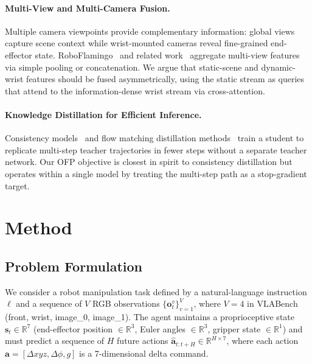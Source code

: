 \documentclass[10pt,twocolumn]{article}
\begin{document}
\paragraph{Multi-View and Multi-Camera Fusion.}
Multiple camera viewpoints provide complementary information: global views
capture scene context while wrist-mounted cameras reveal fine-grained
end-effector state.
RoboFlamingo~\cite{li2023roboflamingo} and related work~\cite{shridhar2023perceiver}
aggregate multi-view features via simple pooling or concatenation.
We argue that static-scene and dynamic-wrist features should be fused
asymmetrically, using the static stream as queries that attend to the
information-dense wrist stream via cross-attention.

\paragraph{Knowledge Distillation for Efficient Inference.}
Consistency models~\cite{song2023consistency} and flow matching distillation
methods~\cite{liu2023flow} train a student to replicate multi-step teacher
trajectories in fewer steps without a separate teacher network.
Our OFP objective is closest in spirit to consistency distillation but
operates within a single model by treating the multi-step path as a
stop-gradient target.


\section{Method}
\label{sec:method}

\subsection{Problem Formulation}
\label{sec:method:problem}

We consider a robot manipulation task defined by a natural-language instruction
$\ell$ and a sequence of $V$ RGB observations
$\{\mathbf{o}^v_t\}_{v=1}^{V}$, where $V{=}4$ in VLABench
(front, wrist, image\_0, image\_1).
The agent maintains a proprioceptive state
$\mathbf{s}_t \in \mathbb{R}^{7}$
(end-effector position $\in\mathbb{R}^3$, Euler angles $\in\mathbb{R}^3$,
gripper state $\in\mathbb{R}^1$)
and must predict a sequence of $H$ future actions
$\hat{\mathbf{a}}_{t:t+H} \in \mathbb{R}^{H \times 7}$,
where each action $\mathbf{a} = [\Delta xyz, \Delta\phi, g]$
is a 7-dimensional delta command.
\end{document}
